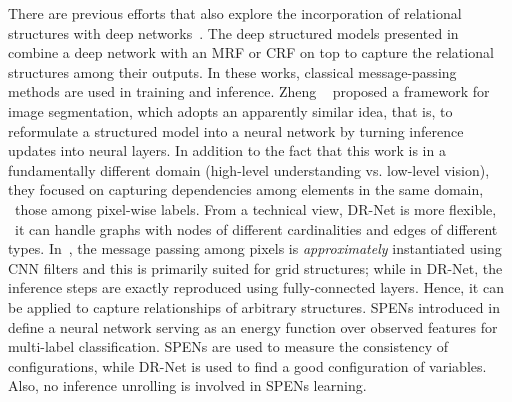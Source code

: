 \documentclass[10pt,twocolumn,letterpaper]{article}
\begin{document}
There are previous efforts that also explore the incorporation of relational structures 
with deep networks~\cite{chen2015learning, zheng2015conditional, schwing2015fully, belanger2015structured}. 
%
The deep structured models presented in \cite{chen2015learning,schwing2015fully,wu2016deep} combine
a deep network with an MRF or CRF on top to capture the relational structures among their outputs. 
In these works, classical message-passing methods are used in training and inference.
%
Zheng \etal~\cite{zheng2015conditional} proposed a framework for image segmentation,
which adopts an apparently similar idea, that is, 
to reformulate a structured model into a neural network by turning inference updates into neural layers. 
In addition to the fact that this work is in a fundamentally different domain 
(high-level understanding vs. low-level vision), 
they focused on capturing dependencies among elements in the same domain,
\eg~those among pixel-wise labels.
From a technical view, DR-Net is more flexible, 
\eg~it can handle graphs with nodes of different cardinalities and edges of different types.
In~\cite{zheng2015conditional}, the message passing among pixels is \emph{approximately} 
instantiated using CNN filters and this is primarily suited for grid structures; 
while in DR-Net, the inference steps are exactly reproduced using fully-connected layers.
Hence, it can be applied to capture relationships of arbitrary structures.
%
SPENs introduced in \cite{belanger2015structured} define a neural network 
serving as an energy function over observed features for multi-label classification.
SPENs are used to measure the consistency of configurations, 
while DR-Net is used to find a good configuration of variables.
Also, no inference unrolling is involved in SPENs learning.

\end{document}

